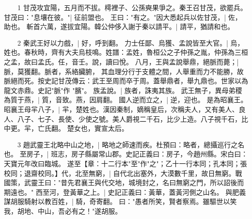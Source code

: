 　　1 甘茂攻宜陽，五月而不拔。樗裡子、公孫奭果爭之。秦王召甘茂，欲罷兵。甘茂曰："息壤在彼。"|{
	征前盟也。
	}
王曰："有之。"因大悉起兵以佐甘茂，|{
	佐，助也。
	}
斬首六萬，遂拔宜陽。韓公仲侈入謝于秦以請平。|{
	請平，猶請和也。
	}

　　2 秦武王好以力戲，|{
	好，呼到翻。
	}
力士任鄙、烏獲、孟說皆至大官。|{
	烏，姓也。春秋時，齊有大夫烏枝鳴。姓譜：孟姓，魯桓公之子仲孫之胤，仲孫為三桓之孟，故曰孟氏。任，音壬。說，讀曰悅。
	}
八月，王與孟說舉鼎，絕脈而薨；|{
	脈，莫獲翻。脈者，系絡臟腑， 其血理分行于支體之間，人舉重而力不能勝，故脈絕而死。按史記甘茂傳云：武王至周而卒于周。蓋舉鼎者，舉九鼎也。世家以為龍文赤鼎。史記"脈"作 "臏"。
	}
族孟說。|{
	族者，誅夷其族。
	}
武王無子，異母弟稷為質于燕，|{
	質，音致。燕，因肩翻。
	}
國人逆而立之，|{
	逆，迎也。
	}
是為昭襄王。昭襄王母羋八子，|{
	羋，楚姓也。漢因秦制，嫡稱皇后，次稱夫人，又有美人、良人、八子、七子、長使、少使之號。美人爵視二千石，比少上造。八子視千石，比中更。羋，亡氏翻。
	}
楚女也，實宣太后。

　　3 趙武靈王北略中山之地，|{
	略地之師速而疾。杜預曰：略者，總攝巡行之名也。
	}
至房子，|{
	班志，房子縣屬常山郡。史記正義曰：房子，今趙州縣。宋白曰：天寶元年改曰臨城。
	}
遂至【章：十二行本"至"作"之"；乙十一行本同；孔本同；張校同；退齋校同。】代，北至無窮，|{
	自代北出塞外，大漠數千里，故日無窮。戰國策，武靈王曰："昔先君襄王與代交地，城境封之，名曰無窮之門，所以詔後而期遠也。"
	}
西至河，登黃華之上。|{
	史記正義曰：黃華，蓋黃河側之山名。
	}
與肥義謀胡服騎射以教百姓，|{
	騎，奇寄翻。
	}
曰："愚者所笑，賢者察焉。雖驅世以笑我，胡地、中山，吾必有之！"遂胡服。

